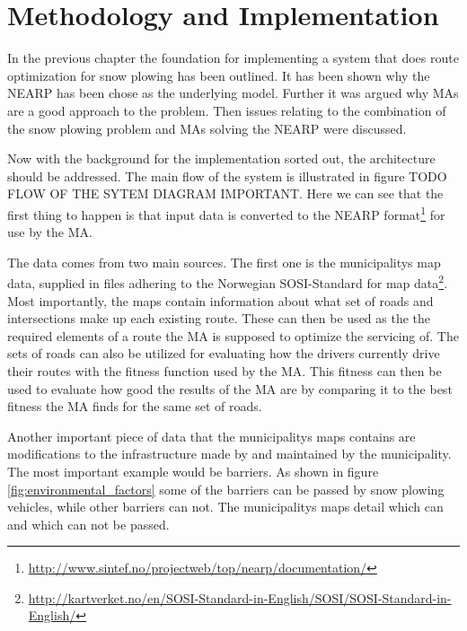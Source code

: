 \chapter{Methodology and Implementation}

In the previous chapter the foundation for implementing a system that does route optimization for snow plowing has been outlined. It has been shown why the NEARP has been chose as the underlying model. Further it was argued why MAs are a good approach to the problem. Then issues relating to the combination of the snow plowing problem and MAs solving the NEARP were discussed.

Now with the background for the implementation sorted out, the architecture should be addressed. The main flow of the system is illustrated in figure TODO FLOW OF THE SYTEM DIAGRAM IMPORTANT. Here we can see that the first thing to happen is that input data is converted to the NEARP format\footnote{\url{http://www.sintef.no/projectweb/top/nearp/documentation/}} for use by the MA.


The data comes from two main sources. The first one is the municipalitys map data, supplied in files adhering to the Norwegian SOSI-Standard for map data\footnote{\url{http://kartverket.no/en/SOSI-Standard-in-English/SOSI/SOSI-Standard-in-English/}}. Most importantly, the maps contain information about what set of roads and intersections make up each existing route. These can then be used as the the required elements of a route the MA is supposed to optimize the servicing of. The sets of roads can also be utilized for evaluating how the drivers currently drive their routes with the fitness function used by the MA. This fitness can then be used to evaluate how good the results of the MA are by comparing it to the best fitness the MA finds for the same set of roads.

Another important piece of data that the municipalitys maps contains are modifications to the infrastructure made by and maintained by the municipality. The most important example would be barriers. As shown in figure \ref{fig:environmental_factors} some of the barriers can be passed by snow plowing vehicles, while other barriers can not. The municipalitys maps detail which can and which can not be passed.



